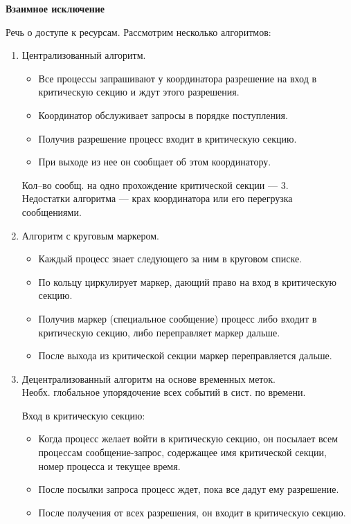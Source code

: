 \centerline{\textbf{Взаимное исключение}}

Речь о доступе к ресурсам. Рассмотрим несколько алгоритмов:
\begin{enumerate}
\item 
Централизованный алгоритм.
\begin{itemize}
\item 
Все процессы запрашивают у координатора разрешение на вход в критическую секцию и ждут этого разрешения. 
\item 
Координатор обслуживает запросы в порядке поступления. 
\item 
Получив разрешение процесс входит в критическую секцию. 
\item 
При выходе из нее он сообщает об этом координатору. 
\end{itemize}
Кол--во сообщ. на одно прохождение критической секции --- 3.
\\
Недостатки алгоритма --- крах координатора или его перегрузка сообщениями.

\item 
Алгоритм с круговым маркером.
\begin{itemize}
\item Каждый процесс знает следующего за ним в круговом списке.
\item По кольцу циркулирует маркер, дающий право на вход в критическую секцию. 
\item Получив маркер (специальное сообщение) процесс либо входит в критическую секцию, либо переправляет маркер дальше.
\item После выхода из критической секции маркер переправляется дальше.
\end{itemize}

\item
Децентрализованный алгоритм на основе временных меток.
\\
Необх. глобальное упорядочение всех событий в сист. по времени.

Вход в критическую секцию:
\begin{itemize}
\item
Когда процесс желает войти в критическую секцию, он посылает всем процессам сообщение-запрос, содержащее имя критической секции, номер процесса и текущее время.
\item После посылки запроса процесс ждет, пока все дадут ему разрешение.
\item После получения от всех разрешения, он входит в критическую секцию.
\end{itemize}


\end{enumerate}

